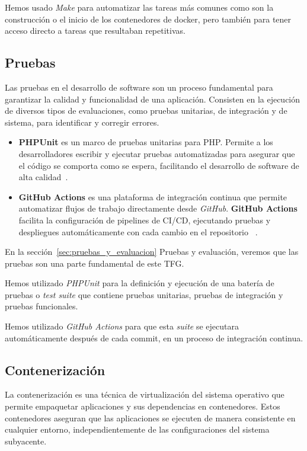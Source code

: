 Hemos usado \textit{Make} para automatizar las tareas más comunes como son la construcción o el inicio de los
contenedores de docker, pero también para tener acceso directo a tareas que resultaban repetitivas.

\subsection*{Pruebas}

Las pruebas en el desarrollo de software son un proceso fundamental para garantizar la calidad y funcionalidad de una
aplicación.
Consisten en la ejecución de diversos tipos de evaluaciones, como pruebas unitarias, de integración y de sistema, para
identificar y corregir errores.

\begin{itemize}
    \item \textbf{PHPUnit} es un marco de pruebas unitarias para PHP. Permite a los desarrolladores escribir y
    ejecutar pruebas automatizadas para asegurar que el código se comporta como se espera, facilitando el desarrollo de
    software de alta calidad~\cite{url_phpunit}.
    \item \textbf{GitHub Actions} es una plataforma de integración continua que permite automatizar flujos de
    trabajo directamente desde \textit{GitHub}.
    \textbf{GitHub Actions} facilita la configuración de pipelines de CI/CD, ejecutando pruebas y despliegues
    automáticamente con cada cambio en el repositorio ~\cite{url_github_actions}.
\end{itemize}

En la sección~\ref{sec:pruebas_y_evaluacion} Pruebas y evaluación, veremos que las pruebas son una parte fundamental
de este TFG.

Hemos utilizado \textit{PHPUnit} para la definición y ejecución de una batería de pruebas o \textit{test suite} que
contiene pruebas unitarias, pruebas de integración y pruebas funcionales.

Hemos utilizado \textit{GitHub Actions} para que esta \textit{suite} se ejecutara automáticamente después de cada
commit, en un proceso de integración continua.

\subsection*{Contenerización}

La contenerización es una técnica de virtualización del sistema operativo que permite empaquetar aplicaciones y
sus dependencias en contenedores.
Estos contenedores aseguran que las aplicaciones se ejecuten de manera consistente en cualquier entorno,
independientemente de las configuraciones del sistema subyacente.

